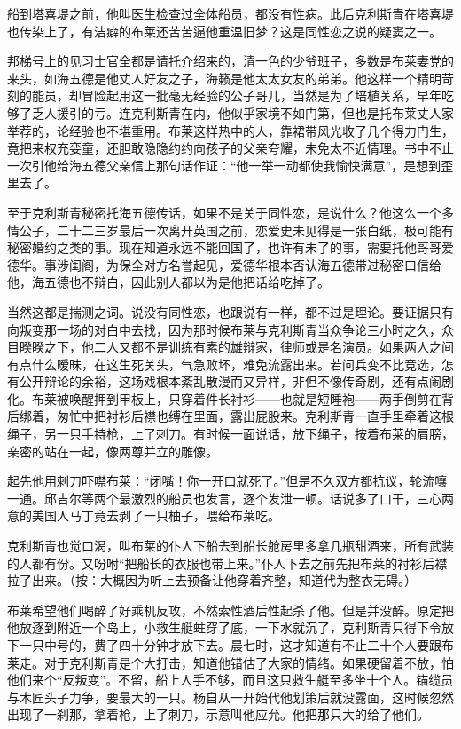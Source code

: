 \par 船到塔喜堤之前，他叫医生检查过全体船员，都没有性病。此后克利斯青在塔喜堤也传染上了，有洁癖的布莱还苦苦逼他重温旧梦？这是同性恋之说的疑窦之一。
\par 邦梯号上的见习士官全都是请托介绍来的，清一色的少爷班子，多数是布莱妻党的来头，如海五德是他丈人好友之子，海籁是他太太女友的弟弟。他这样一个精明苛刻的能员，却冒险起用这一批毫无经验的公子哥儿，当然是为了培植关系，早年吃够了乏人援引的亏。连克利斯青在内，他似乎家境不如门第，但也是托布莱丈人家举荐的，论经验也不堪重用。布莱这样热中的人，靠裙带风光收了几个得力门生，竟把来权充娈童，还胆敢隐隐约约向孩子的父亲夸耀，未免太不近情理。书中不止一次引他给海五德父亲信上那句话作证：“他一举一动都使我愉快满意”，是想到歪里去了。
\par 至于克利斯青秘密托海五德传话，如果不是关于同性恋，是说什么？他这么一个多情公子，二十二三岁最后一次离开英国之前，恋爱史未见得是一张白纸，极可能有秘密婚约之类的事。现在知道永远不能回国了，也许有未了的事，需要托他哥哥爱德华。事涉闺阁，为保全对方名誉起见，爱德华根本否认海五德带过秘密口信给他，海五德也不辩白，因此别人都以为是他把话给吃掉了。
\par 当然这都是揣测之词。说没有同性恋，也跟说有一样，都不过是理论。要证据只有向叛变那一场的对白中去找，因为那时候布莱与克利斯青当众争论三小时之久，众目睽睽之下，他二人又都不是训练有素的雄辩家，律师或是名演员。如果两人之间有点什么暧昧，在这生死关头，气急败坏，难免流露出来。若问兵变不比竞选，怎有公开辩论的余裕，这场戏根本紊乱散漫而又异样，非但不像传奇剧，还有点闹剧化。布莱被唤醒押到甲板上，只穿着件长衬衫——也就是短睡袍——两手倒剪在背后绑着，匆忙中把衬衫后襟也缚在里面，露出屁股来。克利斯青一直手里牵着这根绳子，另一只手持枪，上了刺刀。有时候一面说话，放下绳子，按着布莱的肩膀，亲密的站在一起，像两尊并立的雕像。
\par 起先他用刺刀吓噤布莱：“闭嘴！你一开口就死了。”但是不久双方都抗议，轮流嚷一通。邱吉尔等两个最激烈的船员也发言，逐个发泄一顿。话说多了口干，三心两意的美国人马丁竟去剥了一只柚子，喂给布莱吃。
\par 克利斯青也觉口渴，叫布莱的仆人下船去到船长舱房里多拿几瓶甜酒来，所有武装的人都有份。又吩咐“把船长的衣服也带上来。”仆人下去之前先把布莱的衬衫后襟拉了出来。（按：大概因为听上去预备让他穿着齐整，知道代为整衣无碍。）
\par 布莱希望他们喝醉了好乘机反攻，不然索性酒后性起杀了他。但是并没醉。原定把他放逐到附近一个岛上，小救生艇蛀穿了底，一下水就沉了，克利斯青只得下令放下一只中号的，费了四十分钟才放下去。晨七时，这才知道有不止二十个人要跟布莱走。对于克利斯青是个大打击，知道他错估了大家的情绪。如果硬留着不放，怕他们来个“反叛变”。不留，船上人手不够，而且这只救生艇至多坐十个人。锚缆员与木匠头子力争，要最大的一只。杨自从一开始代他划策后就没露面，这时候忽然出现了一刹那，拿着枪，上了刺刀，示意叫他应允。他把那只大的给了他们。

